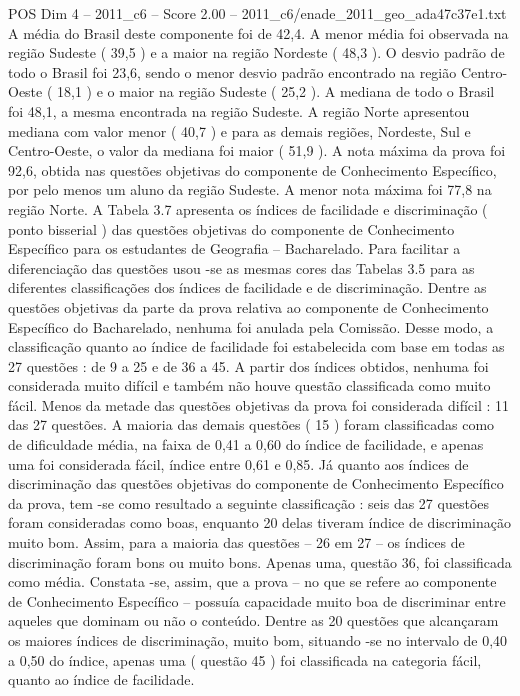 \begin{textsample}{POS Dim 4 – 2011\_c6 – Score 2.00 – 2011\_c6/enade\_2011\_geo\_ada47c37e1.txt}
A média do Brasil deste componente foi de 42,4.
A menor média foi observada na região Sudeste ( 39,5 ) e a maior na região Nordeste ( 48,3 ).
O desvio padrão de todo o Brasil foi 23,6, sendo o menor desvio padrão encontrado na região Centro-Oeste ( 18,1 ) e o maior na região Sudeste ( 25,2 ).
A mediana de todo o Brasil foi 48,1, a mesma encontrada na região Sudeste.
A região Norte apresentou mediana com valor menor ( 40,7 ) e para as demais regiões, Nordeste, Sul e Centro-Oeste, o valor da mediana foi maior ( 51,9 ).
A nota máxima da prova foi 92,6, obtida nas questões objetivas do componente de Conhecimento Específico, por pelo menos um aluno da região Sudeste.
A menor nota máxima foi 77,8 na região Norte.
A Tabela 3.7 apresenta os índices de facilidade e discriminação ( ponto bisserial ) das questões objetivas do componente de Conhecimento Específico para os estudantes de Geografia – Bacharelado.
Para facilitar a diferenciação das questões usou -se as mesmas cores das Tabelas 3.5 para as diferentes classificações dos índices de facilidade e de discriminação.
Dentre as questões objetivas da parte da prova relativa ao componente de Conhecimento Específico do Bacharelado, nenhuma foi anulada pela Comissão.
Desse modo, a classificação quanto ao índice de facilidade foi estabelecida com base em todas as 27 questões : de 9 a 25 e de 36 a 45.
A partir dos índices obtidos, nenhuma foi considerada muito difícil e também não houve questão classificada como muito fácil.
Menos da metade das questões objetivas da prova foi considerada difícil : 11 das 27 questões.
A maioria das demais questões ( 15 ) foram classificadas como de dificuldade média, na faixa de 0,41 a 0,60 do índice de facilidade, e apenas uma foi considerada fácil, índice entre 0,61 e 0,85.
Já quanto aos índices de discriminação das questões objetivas do componente de Conhecimento Específico da prova, tem -se como resultado a seguinte classificação : seis das 27 questões foram consideradas como boas, enquanto 20 delas tiveram índice de discriminação muito bom.
Assim, para a maioria das questões – 26 em 27 – os índices de discriminação foram bons ou muito bons.
Apenas uma, questão 36, foi classificada como média.
Constata -se, assim, que a prova – no que se refere ao componente de Conhecimento Específico – possuía capacidade muito boa de discriminar entre aqueles que dominam ou não o conteúdo.
Dentre as 20 questões que alcançaram os maiores índices de discriminação, muito bom, situando -se no intervalo de 0,40 a 0,50 do índice, apenas uma ( questão 45 ) foi classificada na categoria fácil, quanto ao índice de facilidade.

\end{textsample}
